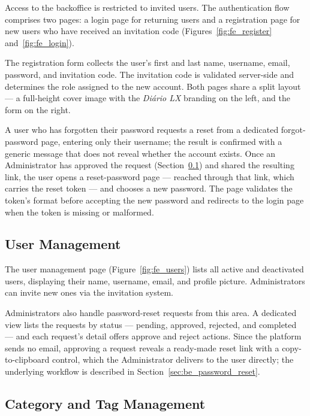 Access to the backoffice is restricted to invited users. The authentication flow
comprises two pages: a login page for returning users and a registration page for
new users who have received an invitation code
(Figures~\ref{fig:fe_register} and~\ref{fig:fe_login}).

The registration form collects the user's first and last name, username, email,
password, and invitation code. The invitation code is validated server-side and
determines the role assigned to the new account. Both pages share a split layout
--- a full-height cover image with the \textit{Diário LX} branding on the left, and the
form on the right.

A user who has forgotten their password requests a reset from a dedicated
forgot-password page, entering only their username; the result is confirmed with a
generic message that does not reveal whether the account exists. Once an Administrator has
approved the request (Section~\ref{sec:fe_user_mgmt}) and shared the resulting link, the
user opens a reset-password page --- reached through that link, which carries the reset
token --- and chooses a new password. The page validates the token's format before
accepting the new password and redirects to the login page when the token is missing or
malformed.

\subsection{User Management} \label{sec:fe_user_mgmt}

The user management page (Figure~\ref{fig:fe_users}) lists all active and deactivated
users, displaying their name, username, email, and profile picture. Administrators
can invite new ones via the invitation system.

Administrators also handle password-reset requests from this area. A dedicated view lists
the requests by status --- pending, approved, rejected, and completed --- and each
request's detail offers approve and reject actions. Since the platform sends no email,
approving a request reveals a ready-made reset link with a copy-to-clipboard control,
which the Administrator delivers to the user directly; the underlying workflow is
described in Section~\ref{sec:be_password_reset}.

\subsection{Category and Tag Management} \label{sec:fe_cat_mgmt}

